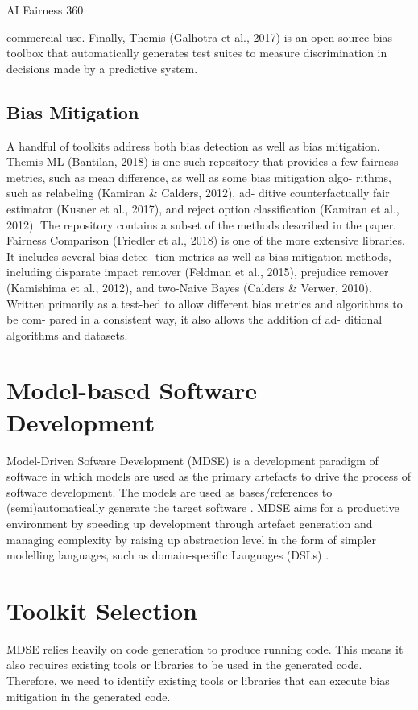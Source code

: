 \documentclass[final,5p,times,twocolumn]{elsarticle}
\begin{document}
AI Fairness 360

commercial use. Finally, Themis (Galhotra et al., 2017) is
an open source bias toolbox that automatically generates
test suites to measure discrimination in decisions made by
a predictive system.

\subsection{Bias Mitigation}
\label{sec:bias_mitigation}

A handful of toolkits address both bias detection as well
as bias mitigation. Themis-ML (Bantilan, 2018) is one
such repository that provides a few fairness metrics, such
as mean difference, as well as some bias mitigation algo-
rithms, such as relabeling (Kamiran \& Calders, 2012), ad-
ditive counterfactually fair estimator (Kusner et al., 2017),
and reject option classiﬁcation (Kamiran et al., 2012). The
repository contains a subset of the methods described in the
paper. Fairness Comparison (Friedler et al., 2018) is one of
the more extensive libraries. It includes several bias detec-
tion metrics as well as bias mitigation methods, including
disparate impact remover (Feldman et al., 2015), prejudice
remover (Kamishima et al., 2012), and two-Naive Bayes
(Calders \& Verwer, 2010). Written primarily as a test-bed
to allow different bias metrics and algorithms to be com-
pared in a consistent way, it also allows the addition of ad-
ditional algorithms and datasets.

\section{Model-based Software Development}
\label{sec:model_based_software_development}
Model-Driven Sofware Development (MDSE) is a development paradigm of software in which models are used as the primary artefacts to drive the process of software development. The models are used as bases/references to (semi)automatically generate the target software \cite{brambilla2017model}. MDSE aims for a productive environment by speeding up development through artefact generation and managing complexity by raising up abstraction level in the form of simpler modelling languages, such as domain-specific Languages (DSLs) \cite{volter2013model}. 


\section{Toolkit Selection}
\label{sec:toolkit_selection}
MDSE relies heavily on code generation to produce running code. This means it also requires existing tools or libraries to be used in the generated code. Therefore, we need to identify existing tools or libraries that can execute bias mitigation in the generated code. 
\end{document}
